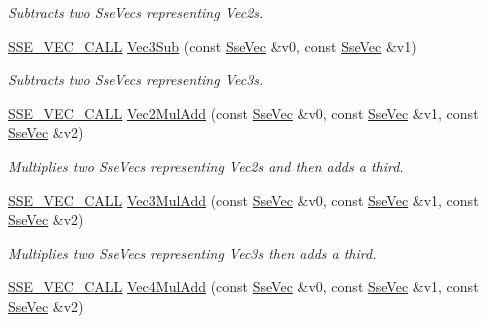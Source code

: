 \begin{DoxyCompactItemize}
\begin{DoxyCompactList}\small\item\em Subtracts two Sse\+Vecs representing Vec2s. \end{DoxyCompactList}\item 
\hyperlink{ssevec__math__defs_8h_a97454f977a5281455cecacce1e8ba670}{S\+S\+E\+\_\+\+V\+E\+C\+\_\+\+C\+A\+L\+L} \hyperlink{group___s_i_m_d_vec_math_ga5f3b7d87abe3715706c16b516b70b576}{Vec3\+Sub} (const \hyperlink{namespacegfxmath_a0de2243e2b8d0fd46d3af5e036423004}{Sse\+Vec} \&v0, const \hyperlink{namespacegfxmath_a0de2243e2b8d0fd46d3af5e036423004}{Sse\+Vec} \&v1)
\begin{DoxyCompactList}\small\item\em Subtracts two Sse\+Vecs representing Vec3s. \end{DoxyCompactList}\item 
\hyperlink{ssevec__math__defs_8h_a97454f977a5281455cecacce1e8ba670}{S\+S\+E\+\_\+\+V\+E\+C\+\_\+\+C\+A\+L\+L} \hyperlink{group___s_i_m_d_vec_math_gad909161c79a7eb47e0412e98d5dbc02f}{Vec2\+Mul\+Add} (const \hyperlink{namespacegfxmath_a0de2243e2b8d0fd46d3af5e036423004}{Sse\+Vec} \&v0, const \hyperlink{namespacegfxmath_a0de2243e2b8d0fd46d3af5e036423004}{Sse\+Vec} \&v1, const \hyperlink{namespacegfxmath_a0de2243e2b8d0fd46d3af5e036423004}{Sse\+Vec} \&v2)
\begin{DoxyCompactList}\small\item\em Multiplies two Sse\+Vecs representing Vec2s and then adds a third. \end{DoxyCompactList}\item 
\hyperlink{ssevec__math__defs_8h_a97454f977a5281455cecacce1e8ba670}{S\+S\+E\+\_\+\+V\+E\+C\+\_\+\+C\+A\+L\+L} \hyperlink{group___s_i_m_d_vec_math_ga87ae683bc9bc6226eeb0c6b219ffd03a}{Vec3\+Mul\+Add} (const \hyperlink{namespacegfxmath_a0de2243e2b8d0fd46d3af5e036423004}{Sse\+Vec} \&v0, const \hyperlink{namespacegfxmath_a0de2243e2b8d0fd46d3af5e036423004}{Sse\+Vec} \&v1, const \hyperlink{namespacegfxmath_a0de2243e2b8d0fd46d3af5e036423004}{Sse\+Vec} \&v2)
\begin{DoxyCompactList}\small\item\em Multiplies two Sse\+Vecs representing Vec3s then adds a third. \end{DoxyCompactList}\item 
\hyperlink{ssevec__math__defs_8h_a97454f977a5281455cecacce1e8ba670}{S\+S\+E\+\_\+\+V\+E\+C\+\_\+\+C\+A\+L\+L} \hyperlink{group___s_i_m_d_vec_math_gaa9e5b230025c4896a419cc7c4a73b62c}{Vec4\+Mul\+Add} (const \hyperlink{namespacegfxmath_a0de2243e2b8d0fd46d3af5e036423004}{Sse\+Vec} \&v0, const \hyperlink{namespacegfxmath_a0de2243e2b8d0fd46d3af5e036423004}{Sse\+Vec} \&v1, const \hyperlink{namespacegfxmath_a0de2243e2b8d0fd46d3af5e036423004}{Sse\+Vec} \&v2)

\end{DoxyCompactItemize}
